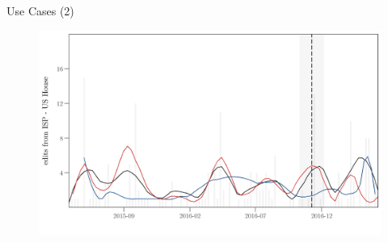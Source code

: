 \begin{frame}{Use Cases (2)}
\begin{figure}[t]
\begin{center}
\vspace{-.1cm}
	\includegraphics[scale=.55]{uc_2_usah_time2.png}
	\vspace{-.5cm}
\end{center}
\end{figure}
\end{frame}

